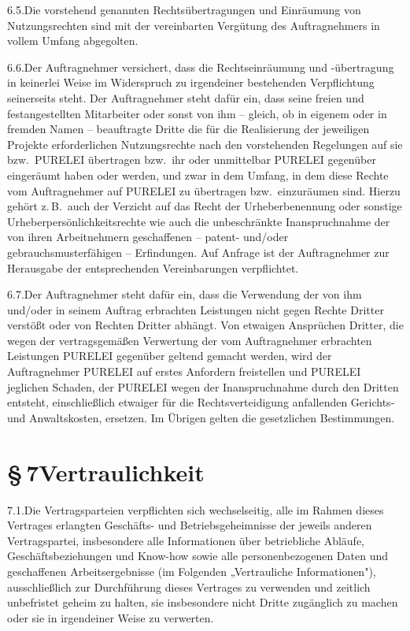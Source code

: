 \documentclass[11pt,a4paper]{article}
\newcommand{\ClientKurzname}{PURELEI}
\begin{document}
6.5.\quad Die vorstehend genannten Rechtsübertragungen und Einräumung von Nutzungsrechten sind mit der vereinbarten Vergütung des Auftragnehmers in vollem Umfang abgegolten.

6.6.\quad Der Auftragnehmer versichert, dass die Rechtseinräumung und -übertragung in keinerlei Weise im Widerspruch zu irgendeiner bestehenden Verpflichtung seinerseits steht. Der Auftragnehmer steht dafür ein, dass seine freien und festangestellten Mitarbeiter oder sonst von ihm – gleich, ob in eigenem oder in fremden Namen – beauftragte Dritte die für die Realisierung der jeweiligen Projekte erforderlichen Nutzungsrechte nach den vorstehenden Regelungen auf sie bzw.\ \ClientKurzname{} übertragen bzw.\ ihr oder unmittelbar \ClientKurzname{} gegenüber eingeräumt haben oder werden, und zwar in dem Umfang, in dem diese Rechte vom Auftragnehmer auf \ClientKurzname{} zu übertragen bzw.\ einzuräumen sind. Hierzu gehört z.\,B.\ auch der Verzicht auf das Recht der Urheberbenennung oder sonstige Urheberpersönlichkeitsrechte wie auch die unbeschränkte Inanspruchnahme der von ihren Arbeitnehmern geschaffenen – patent- und/oder gebrauchsmusterfähigen – Erfindungen. Auf Anfrage ist der Auftragnehmer zur Herausgabe der entsprechenden Vereinbarungen verpflichtet.

6.7.\quad Der Auftragnehmer steht dafür ein, dass die Verwendung der von ihm und/oder in seinem Auftrag erbrachten Leistungen nicht gegen Rechte Dritter verstößt oder von Rechten Dritter abhängt. Von etwaigen Ansprüchen Dritter, die wegen der vertragsgemäßen Verwertung der vom Auftragnehmer erbrachten Leistungen \ClientKurzname{} gegenüber geltend gemacht werden, wird der Auftragnehmer \ClientKurzname{} auf erstes Anfordern freistellen und \ClientKurzname{} jeglichen Schaden, der \ClientKurzname{} wegen der Inanspruchnahme durch den Dritten entsteht, einschließlich etwaiger für die Rechtsverteidigung anfallenden Gerichts- und Anwaltskosten, ersetzen. Im Übrigen gelten die gesetzlichen Bestimmungen.

\section{§\,7\quad Vertraulichkeit}

7.1.\quad Die Vertragsparteien verpflichten sich wechselseitig, alle im Rahmen dieses Vertrages erlangten Geschäfts- und Betriebsgeheimnisse der jeweils anderen Vertragspartei, insbesondere alle Informationen über betriebliche Abläufe, Geschäftsbeziehungen und Know-how sowie alle personenbezogenen Daten und geschaffenen Arbeitsergebnisse (im Folgenden „Vertrauliche Informationen"), ausschließlich zur Durchführung dieses Vertrages zu verwenden und zeitlich unbefristet geheim zu halten, sie insbesondere nicht Dritte zugänglich zu machen oder sie in irgendeiner Weise zu verwerten.
\end{document}
